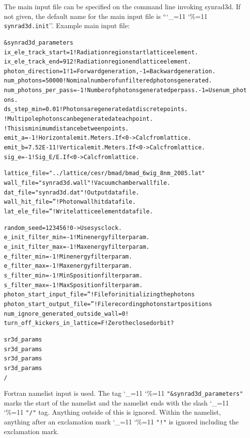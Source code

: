 \documentclass[11pt]{article}
\newcommand\ttcmd{\begingroup\catcode`\_=11 \catcode`\%=11 \dottcmd}
\newcommand\dottcmd[1]{\texttt{#1}\endgroup}
\newcommand{\vn}{\ttcmd}
\newlength{\ExBeg}
\newlength{\ExEnd}
\newenvironment{example}
  {\vspace{\ExBeg} \begin{alltt}}
  {\end{alltt} \vspace{\ExEnd}}
\begin{document}
The main input file can be specified on the command line invoking synrad3d.
If not given, the default name for the main input file is ``\vn{synrad3d.init}''.
Example main input file:
\begin{example}
  &synrad3d_parameters
    ix_ele_track_start   = 1      ! Radiation region start lattice element.
    ix_ele_track_end     = 912    ! Radiation region end lattice element.
    photon_direction     = 1      ! 1 = Forward generation, -1 = Backward generation.
    num_photons          = 50000  ! Nominal number of unfiltered photons generated. 
    num_photons_per_pass = -1     ! Number of photons generated per pass. -1 = Use num_photons.
    ds_step_min      = 0.01   ! Photons are generated at discrete points. 
                              ! Multipole photons can be generated at each point.
                              ! This is minimum distance between points.
    emit_a       = -1         ! Horizontal emit. Meters. If < 0 -> Calc from lattice.
    emit_b       = 7.52E-11   ! Vertical emit.  Meters. If < 0 -> Calc from lattice.
    sig_e        = -1         ! Sig_E/E. If < 0 -> Calc from lattice.

    lattice_file = "../lattice/cesr/bmad/bmad_6wig_8nm_2085.lat" 
    wall_file    = "synrad3d.wall"   ! Vacuum chamber wall file.
    dat_file     = "synrad3d.dat"    ! Output data file.
    wall_hit_file = ''               ! Photon wall hit data file.
    lat_ele_file  = ''               ! Write lattice element data file.

    random_seed = 123456             ! 0 -> Use sys clock.
    e_init_filter_min = -1           ! Min energy filter param.
    e_init_filter_max = -1           ! Max energy filter param.
    e_filter_min = -1                ! Min energy filter param.
    e_filter_max = -1                ! Max energy filter param.
    s_filter_min = -1                ! Min S position filter param.
    s_filter_max = -1                ! Max S position filter param.
    photon_start_input_file  = ''    ! File for initializing the photons
    photon_start_output_file = ''    ! File recording photon start positions
    num_ignore_generated_outside_wall = 0  !
    turn_off_kickers_in_lattice = F        ! Zero the closed orbit?

    sr3d_params%
    sr3d_params%
    sr3d_params%
    sr3d_params%
  /
\end{example}
Fortran namelist input is used.  The tag \vn{"\&synrad3d_parameters"}
marks the start of the namelist and the namelist ends with the slash
\vn{"/"} tag. Anything outside of this is ignored. Within the
namelist, anything after an exclamation mark \vn{"!"} is ignored
including the exclamation mark.
\end{document}
